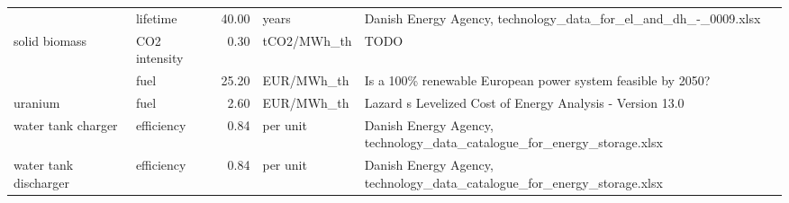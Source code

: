 \begin{longtable}{p{5cm}p{3cm}rp{3cm}p{11cm}}
                      & lifetime &          40.00 &                             years &                                                                                                                                                                                                                                                                      Danish Energy Agency, technology\_data\_for\_el\_and\_dh\_-\_0009.xlsx \\
solid biomass & CO2 intensity &           0.30 &                       tCO2/MWh\_th &                                                                                                                                                                                                                                                                                                                                 TODO \\
                      & fuel &          25.20 &                        EUR/MWh\_th &                                                                                                                                                                                                                                                                          Is a 100\% renewable European power system feasible by 2050? \\
uranium & fuel &           2.60 &                        EUR/MWh\_th &                                                                                                                                                                                                                                                                            Lazard s Levelized Cost of Energy Analysis - Version 13.0 \\
water tank charger & efficiency &           0.84 &                          per unit &                                                                                                                                                                                                                                                              Danish Energy Agency, technology\_data\_catalogue\_for\_energy\_storage.xlsx \\
water tank discharger & efficiency &           0.84 &                          per unit &                                                                                                                                                                                                                                                              Danish Energy Agency, technology\_data\_catalogue\_for\_energy\_storage.xlsx \\
\end{longtable}
